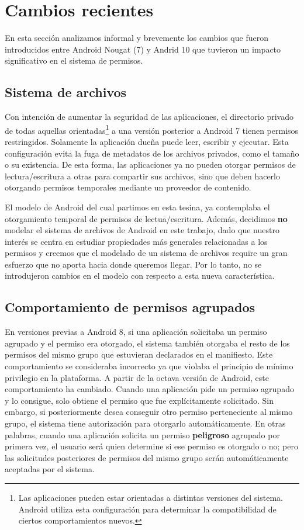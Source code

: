 \section{Cambios recientes}
\label{section:recent-changes}
En esta sección analizamos informal y brevemente los cambios que fueron introducidos entre Android
Nougat (7) y Andrid 10 que tuvieron un impacto significativo en el sistema de permisos.

\subsection{Sistema de archivos}
\label{subsection:recent-changes:filesystem}
Con intención de aumentar la seguridad de las aplicaciones, el directorio privado de todas aquellas
orientadas\footnote{
    Las aplicaciones pueden estar orientadas a distintas versiones del sistema. Android utiliza esta
    configuración para determinar la compatibilidad de ciertos comportamientos nuevos.
} a una versión posterior a Android 7 tienen permisos restringidos. Solamente la aplicación dueña
puede leer, escribir y ejecutar. Esta configuración evita la fuga de metadatos de los archivos
privados, como el tamaño o su existencia. De esta forma, las aplicaciones ya no pueden otorgar
permisos de lectura/escritura a otras para compartir sus archivos, sino que deben hacerlo otorgando
permisos temporales mediante un proveedor de contenido.

El modelo de Android del cual partimos en esta tesina, ya contemplaba el otorgamiento temporal de
permisos de lectua/escritura. Además, decidimos \textbf{no} modelar el sistema de archivos de
Android en este trabajo, dado que nuestro interés se centra en estudiar propiedades más generales
relacionadas a los permisos y creemos que el modelado de un sistema de archivos require un gran
esfuerzo que no aporta hacia donde queremos llegar. Por lo tanto, no se introdujeron cambios en el
modelo con respecto a esta nueva característica.

\subsection{Comportamiento de permisos agrupados}
\label{subsection:recent-changes:grouped-permissions}
En versiones previas a Android 8, si una aplicación solicitaba un permiso agrupado y el permiso era
otorgado, el sistema también otorgaba el resto de los permisos del mismo grupo que estuvieran
declarados en el manifiesto. Este comportamiento se consideraba incorrecto ya que violaba el
principio de mínimo privilegio en la plataforma. A partir de la octava versión de Android,
este comportamiento ha cambiado. Cuando una aplicación pide un permiso agrupado y lo consigue, solo
obtiene el permiso que fue explícitamente solicitado. Sin embargo, si posteriormente desea conseguir
otro permiso perteneciente al mismo grupo, el sistema tiene autorización para otorgarlo
automáticamente. En otras palabras, cuando una aplicación solicita un permiso \textbf{peligroso}
agrupado por primera vez, el usuario será quien determine si ese permiso es otorgado o no; pero las
solicitudes posteriores de permisos del mismo grupo serán automáticamente aceptadas por el sistema.

